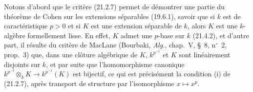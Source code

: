 \begin{env}[21.5.1]
\label{0.21.5.1-fr}
Notons d'abord que le critère (21.2.7) permet de démontrer une partie du
théorème de Cohen sur les extensions séparables (19.6.1), savoir que si $k$
est de caractéristique $p>0$ et si $K$ est une extension séparable de $k$,
alors $K$ est une $k$-algèbre formellement lisse. En effet, $K$ admet une
$p$-base sur $k$ (21.4.2), et d'autre part, il résulte du critère de MacLane
(Bourbaki, \emph{Alg.}, chap.~V, §~8, n$^\circ$~2, prop.~3) que, dans une
clôture algébrique de $K$, $k^{p^{-1}}$ et $K$ sont linéairement disjoints sur
$k$, et par suite que l'homomorphisme canonique
$k^{p^{-1}}\otimes_k K\to k^{p^{-1}}(K)$ est bijectif, ce qui est précisément
la condition (i) de (21.2.7), après transport de structure par
l'isomorphisme $x\mapsto x^p$.
\end{env}
